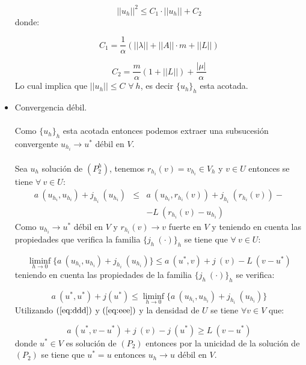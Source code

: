 \begin{demosteorema}
\begin{itemize}
\begin{displaymath}
||u_h||^2\le C_1 \cdot ||u_h|| + C_2
\end{displaymath}
donde:

\begin{displaymath}
C_1=\frac{1}{\alpha }(||\lambda||+||A||\cdot m + ||L||)
\end{displaymath}

\begin{displaymath}
C_2 = \frac{m}{\alpha }(1+||L||)+\frac{|\mu |}{\alpha }
\end{displaymath}
Lo cual implica que $||u_h||\le C$ $\forall \ h$, es decir $\{ u_h \}_h$ esta
acotada.

\item Convergencia d\'ebil.\\ \\
Como $\{ u_h\}_h$ esta acotada entonces podemos extraer una subsucesi\'on
convergente $u_{h_i}\longrightarrow u^*$ d\'ebil en $V$.\\ \\
Sea $u_h$ soluci\'on de $(P_2^h)$, tenemos $r_{h_i}(v)=v_{h_i}\in V_h$ y
$v\in U$ entonces se tiene $\forall \ v\in U$:
\begin{eqnarray} \label{eq:ccc}
a\ (u_{h_i},u_{h_i})+j_{h_i}\ (u_{h_i}) &\le &a\ (u_{h_i},r_{h_i}(v))+
j_{h_i}\ (r_{h_i}(v))-\\ \nonumber
& &-L\ (r_{h_i}(v)-u_{h_i})
\end{eqnarray}
Como $u_{h_i}\to u^*$ d\'ebil en $V$ y $r_{h_i}(v)\to v$ fuerte en $V$ y
teniendo en cuenta las propiedades que verifica la familia
$\{ j_h\ (\cdot )\}_h$ se tiene que $\forall \ v \in U$:

\begin{equation}\label{eq:ddd}
\liminf_{h\to 0} \{a\ (u_{h_i},u_{h_i})+j_{h_i}\ (u_{h_i}) \}\le a\ (u^*,v)+
j\ (v)-L\ (v-u^*)
\end{equation}
teniendo en cuenta las propiedades de la familia $\{j_h\ (\cdot )\}_h$ se
verifica:

\begin{equation}\label{eq:eee}
a\ (u^*,u^*)+j(u^*)\le \liminf_{h\to 0} \{a\ (u_{h_i},u_{h_i})+
j_{h_i}\ (u_{h_i}) \}
\end{equation}
Utilizando $(\ref{eq:ddd})$ y $(\ref{eq:eee})$ y la densidad de $U$ se tiene
$\forall v \in V$ que:

\begin{displaymath}
a\ (u^*,v-u^*)+j\ (v)-j\ (u^*) \ge L\ (v-u^*)
\end{displaymath}
donde $u^*\in V$ es soluci\'on de $(P_2)$ entonces por la unicidad de la
soluci\'on de $(P_2)$ se tiene que $u^*=u$ entonces $u_h\to u$ d\'ebil en $V$.


\end{itemize}
\end{demosteorema}
